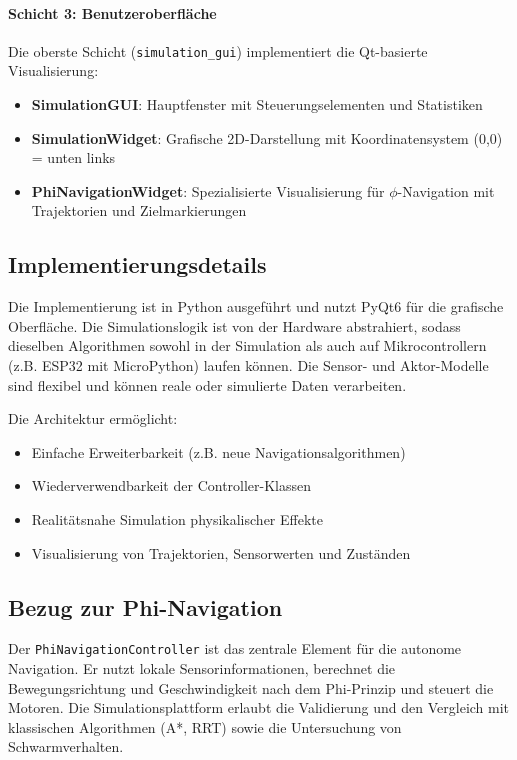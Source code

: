 ﻿\documentclass[a4paper,12pt]{article}
\theoremstyle{definition}
\begin{document}
\paragraph{Schicht 3: Benutzeroberfläche}

Die oberste Schicht (\texttt{simulation\_gui}) implementiert die Qt-basierte Visualisierung:

\begin{itemize}
	\item \textbf{SimulationGUI}: Hauptfenster mit Steuerungselementen und Statistiken
	\item \textbf{SimulationWidget}: Grafische 2D-Darstellung mit Koordinatensystem (0,0) = unten links
	\item \textbf{PhiNavigationWidget}: Spezialisierte Visualisierung für $\phi$-Navigation mit Trajektorien und Zielmarkierungen
\end{itemize}

\subsection{Implementierungsdetails}

Die Implementierung ist in Python ausgeführt und nutzt PyQt6 für die grafische Oberfläche. Die Simulationslogik ist von der Hardware abstrahiert, sodass dieselben Algorithmen sowohl in der Simulation als auch auf Mikrocontrollern (z.B. ESP32 mit MicroPython) laufen können. Die Sensor- und Aktor-Modelle sind flexibel und können reale oder simulierte Daten verarbeiten.

Die Architektur ermöglicht:
\begin{itemize}
	\item[-] Einfache Erweiterbarkeit (z.B. neue Navigationsalgorithmen)
	\item[-] Wiederverwendbarkeit der Controller-Klassen
	\item[-] Realitätsnahe Simulation physikalischer Effekte
	\item[-] Visualisierung von Trajektorien, Sensorwerten und Zuständen
\end{itemize}

\subsection{Bezug zur Phi-Navigation}

Der \texttt{PhiNavigationController} ist das zentrale Element für die autonome Navigation. Er nutzt lokale Sensorinformationen, berechnet die Bewegungsrichtung und Geschwindigkeit nach dem Phi-Prinzip und steuert die Motoren. Die Simulationsplattform erlaubt die Validierung und den Vergleich mit klassischen Algorithmen (A*, RRT) sowie die Untersuchung von Schwarmverhalten.
\end{document}
